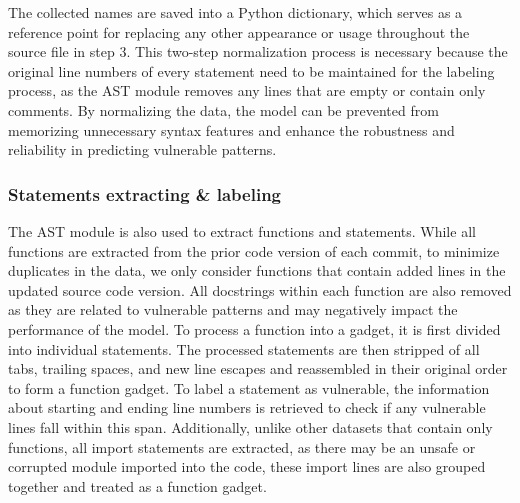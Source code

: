\documentclass{ieeeaccess}
\begin{document}
\par The collected names are saved into a Python dictionary, which serves as a reference point for replacing any other appearance or usage throughout the source file in step 3. This two-step normalization process is necessary because the original line numbers of every statement need to be maintained for the labeling process, as the AST module removes any lines that are empty or contain only comments. By normalizing the data, the model can be prevented from memorizing unnecessary syntax features and enhance the robustness and reliability in predicting vulnerable patterns.
\subsubsection{Statements  extracting \& labeling}
\par The AST module is also used to extract functions and statements. While all functions are extracted from the prior code version of each commit, to minimize duplicates in the data, we only consider functions that contain added lines in the updated source code version. All docstrings within each function are also removed as they are related to vulnerable patterns and may negatively impact the performance of the model. To process a function into a gadget, it is first divided into individual statements. The processed statements are then stripped of all tabs, trailing spaces, and new line escapes and reassembled in their original order to form a function gadget. To label a statement as vulnerable, the information about starting and ending line numbers is retrieved to check if any vulnerable lines fall within this span. Additionally, unlike other datasets that contain only functions\cite{devign, Are}, all import statements are extracted, as there may be an unsafe or corrupted module imported into the code, these import lines are also grouped together and treated as a function gadget.
\end{document}
